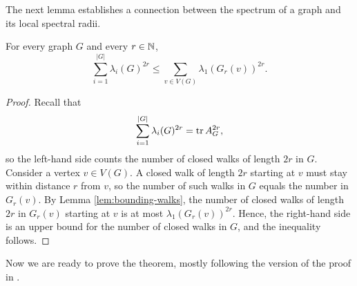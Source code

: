 The next lemma establishes a connection between the spectrum of a graph and its local spectral radii.
\begin{lemma} \label{lem:local-radii}
    For every graph $G$ and every $r \in \mathbb{N}$, 
    \begin{equation*}
        \sum \limits_{i = 1}^{|G|} \lambda_i (G) ^{2r} \le \sum \limits_{v \in V(G)} \lambda_1 (G_r (v))^{2r}.
    \end{equation*}
\end{lemma}

\begin{proof}
    Recall that 
    \begin{equation*}
        \sum \limits_{i = 1}^{|G|} \lambda_i (G) ^{2r} = \operatorname{tr} A_G^{2r},
    \end{equation*}
    so the left-hand side counts the number of closed walks of length $2r$ in $G$.
    Consider a vertex $v \in V(G)$. 
    A closed walk of length $2r$ starting at $v$ must stay within distance $r$ from $v$, so the number of such walks in $G$ equals the number in $G_r(v)$.
    By Lemma \ref{lem:bounding-walks}, the number of closed walks of length $2r$ in $G_r(v)$ starting at $v$ is at most $\lambda_1(G_r (v))^{2r}$. 
    Hence, the right-hand side is an upper bound for the number of closed walks in $G$, and the inequality follows.
\end{proof}

Now we are ready to prove the theorem, mostly following the version of the proof in \cite{equiangularexpository}.


